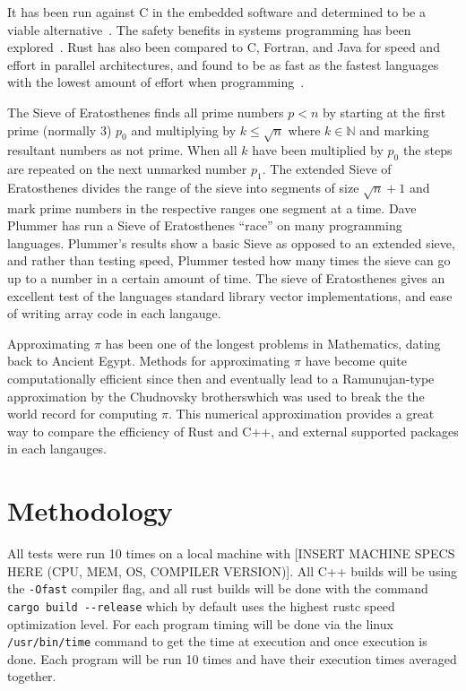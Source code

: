 \documentclass[10pt]{IEEEtran}
\begin{document}
It has been run against C in the embedded software and determined to be a viable alternative~\cite{borgsmuller2021rust}. 
The safety benefits in systems programming has been explored~\cite{BalasubramanianProceedings}. 
Rust has also been compared to C, Fortran, and Java for speed and effort in parallel architectures, 
and found to be as fast as the fastest languages with the lowest amount of effort when programming~\cite{costanzo2021performance}\cite{heyman2020comparison}.
\par
The Sieve of Eratosthenes finds all prime numbers $p<n$ by starting at the first prime (normally 3) $p_0$ and multiplying by $k \leq \sqrt{n}$ where $k \in \mathbb{N}$ and marking resultant numbers as not prime.
When all $k$ have been multiplied by $p_0$ the steps are repeated on the next unmarked number $p_1$.
The extended Sieve of Eratosthenes divides the range of the sieve into segments of size $\sqrt{n}+1$ and mark prime numbers in the respective ranges one segment at a time.
Dave Plummer has run a Sieve of Eratosthenes “race” on many programming languages\cite{plummer}. 
Plummer's results show a basic Sieve as opposed to an extended sieve, and rather than testing speed, Plummer tested how many times 
the sieve can go up to a number in a certain amount of time. 
The sieve of Eratosthenes gives an excellent test of the languages standard library vector implementations, and ease of writing array code in each langauge.
\par
Approximating $\pi$ has been one of the longest problems in Mathematics, dating back to Ancient Egypt\cite{burton}. Methods for approximating $\pi$ have become quite computationally efficient since then and eventually 
lead to a Ramunujan-type approximation by the Chudnovsky brotherswhich was used to break the the world record for computing $\pi$\cite{lynn}.
This numerical approximation provides a great way to compare the efficiency of Rust and C++, and external supported packages in each langauges.

\section{Methodology}
All tests were run 10 times on a local machine with [INSERT MACHINE SPECS HERE (CPU, MEM, OS, COMPILER VERSION)]. All C++ builds will be using the \verb|-Ofast| 
compiler flag, and all rust builds will be done with the command \verb|cargo build --release| which by default 
uses the highest rustc speed optimization level\cite{cargobook}. For each program timing will be done via the linux \verb|/usr/bin/time| command to get the time at execution and once execution is done.
Each program will be run 10 times and have their execution times averaged together.
\end{document}
